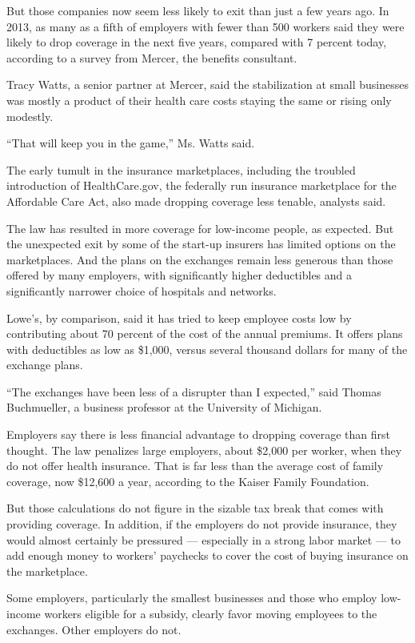 But those companies now seem less likely to exit than just a few years
ago. In 2013, as many as a fifth of employers with fewer than 500
workers said they were likely to drop coverage in the next five years,
compared with 7 percent today, according to a survey from Mercer, the
benefits consultant.

Tracy Watts, a senior partner at Mercer, said the stabilization at small
businesses was mostly a product of their health care costs staying the
same or rising only modestly.

``That will keep you in the game,'' Ms. Watts said.

The early tumult in the insurance marketplaces, including the troubled
introduction of HealthCare.gov, the federally run insurance marketplace
for the Affordable Care Act, also made dropping coverage less tenable,
analysts said.

The law has resulted in more coverage for low-income people, as
expected. But the unexpected exit by some of the start-up insurers has
limited options on the marketplaces. And the plans on the exchanges
remain less generous than those offered by many employers, with
significantly higher deductibles and a significantly narrower choice of
hospitals and networks.

Lowe's, by comparison, said it has tried to keep employee costs low by
contributing about 70 percent of the cost of the annual premiums. It
offers plans with deductibles as low as \$1,000, versus several thousand
dollars for many of the exchange plans.

``The exchanges have been less of a disrupter than I expected,'' said
Thomas Buchmueller, a business professor at the University of Michigan.

Employers say there is less financial advantage to dropping coverage
than first thought. The law penalizes large employers, about \$2,000 per
worker, when they do not offer health insurance. That is far less than
the average cost of family coverage, now \$12,600 a year, according to
the Kaiser Family Foundation.

But those calculations do not figure in the sizable tax break that comes
with providing coverage. In addition, if the employers do not provide
insurance, they would almost certainly be pressured --- especially in a
strong labor market --- to add enough money to workers' paychecks to
cover the cost of buying insurance on the marketplace.

Some employers, particularly the smallest businesses and those who
employ low-income workers eligible for a subsidy, clearly favor moving
employees to the exchanges. Other employers do not.

